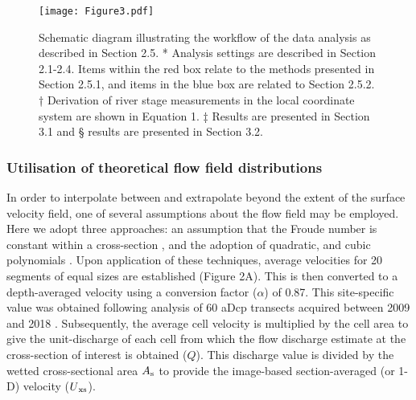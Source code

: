 \documentclass[hess, manuscript]{copernicus}
\begin{document}
\begin{figure*}[]
\centering 
\texttt{[image: Figure3.pdf]}
\caption{Schematic diagram illustrating the workflow of the data analysis as described in Section 2.5. * Analysis settings are described in Section 2.1-2.4. Items within the red box relate to the methods presented in Section 2.5.1, and items in the blue box are related to Section 2.5.2. † Derivation of river stage measurements in the local coordinate system are shown in Equation 1. ‡ Results are presented in Section 3.1 and § results are presented in Section 3.2.}
\label{Figure3} 
\end{figure*}


\subsubsection{Utilisation of theoretical flow field distributions} 
\label{Data-driven fitting}

In order to interpolate between and extrapolate beyond the extent of the surface velocity field, one of several assumptions about the flow field may be employed. Here we adopt three approaches: an assumption that the Froude number is constant within a cross-section \citep{LeCoz2010, Fulford1986}, and the adoption of quadratic, and cubic polynomials \citep{Leitao2018}. Upon application of these techniques, average velocities for 20 segments of equal sizes are established (Figure 2A). This is then converted to a depth-averaged velocity using a conversion factor ($\alpha$) of 0.87. This site-specific value was obtained following analysis of 60 aDcp transects acquired between 2009 and 2018 \citep{alpha_analysis}. Subsequently, the average cell velocity is multiplied by the cell area to give the unit-discharge of each cell from which the flow discharge estimate at the cross-section of interest is obtained (${Q}$). This discharge value is divided by the wetted cross-sectional area {$A\textsubscript{s}$} to provide the image-based section-averaged (or 1-D) velocity (${U}\textsubscript{xs}$).
\end{document}
